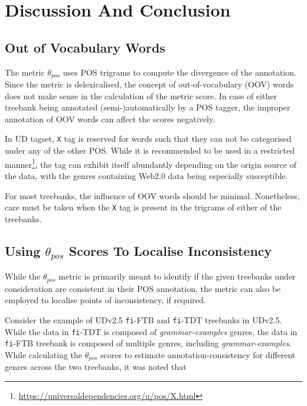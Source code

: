 \section{Discussion And Conclusion}
\label{sec:pos-harmony-conclusion}

\subsection{Out of Vocabulary Words}

The metric \(\theta_{pos}\) uses POS trigrams to compute the divergence of the annotation. Since the metric is delexicalised, the concept of out-of-vocabulary (OOV) words does not make sense in the calculation of the metric score. In case of either treebank being annotated (semi-)automatically by a POS tagger, the improper annotation of OOV words can affect the scores negatively.

In UD tagset, \verb|X| tag is reserved for words such that they can not be categorised under any of the other POS. While it is recommended to be used in a restricted manner\footnote{\url{https://universaldependencies.org/u/pos/X.html}}, the tag can exhibit itself abundantly depending on the origin source of the data, with the genres containing Web2.0 data being especially susceptible.

For most treebanks, the influence of OOV words should be minimal. Nonetheless, care must be taken when the \verb|X| tag is present in the trigrams of either of the treebanks.

\subsection{Using \texorpdfstring{$\theta_{pos}$}{theta\_pos} Scores To Localise Inconsistency}

While the $\theta_{pos}$ metric is primarily meant to identify if the given treebanks under consideration are consistent in their POS annotation, the metric can also be employed to localise points of inconsistency, if required.

Consider the example of UDv2.5 \texttt{fi}-FTB and \texttt{fi}-TDT treebanks in UDv2.5. While the data in \texttt{fi}-TDT is composed of \textit{grammar-examples} genres, the data in \texttt{fi}-FTB treebank is composed of multiple genres, including \textit{grammar-examples}. While calculating the $\theta_{pos}$ scores to estimate annotation-consistency for different genres across the two treebanks, it was noted that 

